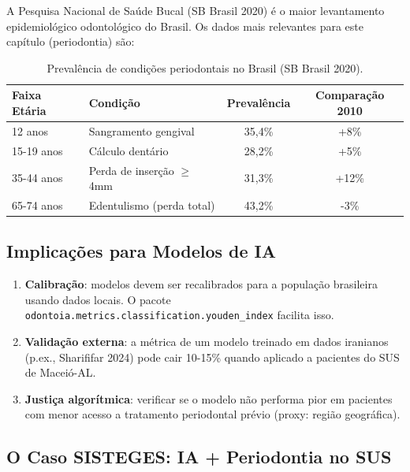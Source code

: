A Pesquisa Nacional de Saúde Bucal (SB Brasil 2020) \cite{sbbrasil2020}
é o maior levantamento epidemiológico odontológico do Brasil. Os
dados mais relevantes para este capítulo (periodontia) são:

\begin{table}[H]
\centering
\small
\begin{tabularx}{\textwidth}{lXcc}
\toprule
\textbf{Faixa Etária} & \textbf{Condição} & \textbf{Prevalência} & \textbf{Comparação 2010} \\
\midrule
12 anos & Sangramento gengival & 35,4\% & +8\% \\
15-19 anos & Cálculo dentário & 28,2\% & +5\% \\
35-44 anos & Perda de inserção $\geq$ 4mm & 31,3\% & +12\% \\
65-74 anos & Edentulismo (perda total) & 43,2\% & -3\% \\
\bottomrule
\end{tabularx}
\caption{Prevalência de condições periodontais no Brasil (SB Brasil 2020).}
\label{tab:sbbrasil-periodontia}
\end{table}

\subsection*{Implicações para Modelos de IA}


\begin{enumerate}
    \item \textbf{Calibração}: modelos devem ser recalibrados para a
    população brasileira usando dados locais. O pacote
    \texttt{odontoia.metrics.classification.youden\_index} facilita isso.
    \item \textbf{Validação externa}: a métrica de um modelo treinado
    em dados iranianos (p.ex., Sharififar 2024) pode cair 10-15\%
    quando aplicado a pacientes do SUS de Maceió-AL.
    \item \textbf{Justiça algorítmica}: verificar se o modelo não
    performa pior em pacientes com menor acesso a tratamento
    periodontal prévio (proxy: região geográfica).
\end{enumerate}

\subsection*{O Caso SISTEGES: IA + Periodontia no SUS}

